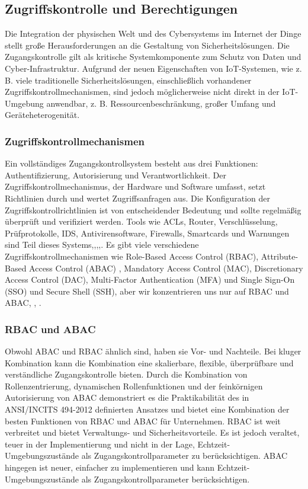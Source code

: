 \subsection{Zugriffskontrolle und Berechtigungen}

Die Integration der physischen Welt und des Cybersystems im Internet der Dinge stellt große Herausforderungen an die Gestaltung von Sicherheitslösungen. Die Zugangskontrolle gilt als kritische Systemkomponente zum Schutz von Daten und Cyber-Infrastruktur. Aufgrund der neuen Eigenschaften von IoT-Systemen, wie z. B. viele traditionelle Sicherheitslösungen, einschließlich vorhandener Zugriffskontrollmechanismen, sind jedoch möglicherweise nicht direkt in der IoT-Umgebung anwendbar, z. B. Ressourcenbeschränkung, großer Umfang und Geräteheterogenität.\cite{8038503}\cite{ouaddah2017access}

\subsubsection{Zugriffskontrollmechanismen}

Ein vollständiges Zugangskontrollsystem besteht aus drei Funktionen: Authentifizierung, Autorisierung und Verantwortlichkeit. Der Zugriffskontrollmechanismus, der Hardware und Software umfasst, setzt Richtlinien durch und wertet Zugriffsanfragen aus. Die Konfiguration der Zugriffskontrollrichtlinien ist von entscheidender Bedeutung und sollte regelmäßig überprüft und verifiziert werden. Tools wie ACLs, Router, Verschlüsselung, Prüfprotokolle, IDS, Antivirensoftware, Firewalls, Smartcards und Warnungen sind Teil dieses Systems\cite{ouaddah2017access},\cite{vollbrecht2000rfc2904},\cite{boyle2007survey},\cite{hu2011anomaly},\cite{ledru2011validation}.
Es gibt viele verschiedene Zugriffskontrollmechanismen wie Role-Based Access Control (RBAC), Attribute-Based Access Control (ABAC) , Mandatory Access Control (MAC), Discretionary Access Control (DAC), Multi-Factor Authentication (MFA) und Single Sign-On (SSO) und Secure Shell (SSH), aber wir konzentrieren uns nur auf RBAC und ABAC\cite{ouaddah2017access}, \cite{coyne2013abac}, \cite{ameer2022hybrid}\cite{ali2019internet}\cite{dutta2020context}.

\subsubsection{RBAC und ABAC}

Obwohl ABAC und RBAC ähnlich sind, haben sie Vor- und Nachteile. Bei kluger Kombination kann die Kombination eine skalierbare, flexible, überprüfbare und verständliche Zugangskontrolle bieten. Durch die Kombination von Rollenzentrierung, dynamischen Rollenfunktionen und der feinkörnigen Autorisierung von ABAC demonstriert es die Praktikabilität des in ANSI/INCITS 494-2012 definierten Ansatzes und bietet eine Kombination der besten Funktionen von RBAC und ABAC für Unternehmen.
RBAC ist weit verbreitet und bietet Verwaltungs- und Sicherheitsvorteile. Es ist jedoch veraltet, teuer in der Implementierung und nicht in der Lage, Echtzeit-Umgebungszustände als Zugangskontrollparameter zu berücksichtigen. ABAC hingegen ist neuer, einfacher zu implementieren und kann Echtzeit-Umgebungszustände als Zugangskontrollparameter berücksichtigen.

